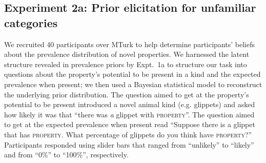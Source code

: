 \documentclass{pnastwo}
\begin{document}
\begin{article}
\begin{materials}
\subsection{Experiment 2a: Prior elicitation for unfamiliar categories}
We recruited 40 participants over MTurk to help determine participants' beliefs about the prevalence distribution of novel properties.
We harnessed the latent structure revealed in prevalence priors by Expt.~1a to structure our task into questions about the property's potential to be present in a kind and the expected prevalence when present; we then used a Bayesian statistical model to reconstruct the underlying prior distribution. 
The question aimed to get at the property's potential to be present introduced a novel animal kind (e.g. glippets) and asked how likely it was that  ``there was \emph{a} glippet with \textsc{property}''.
The question aimed to get at the expected prevalence when present read ``Suppose there is a glippet that has \textsc{property}. What percentage of glippets do you think have \textsc{property}?'' 
Participants responded using slider bars that ranged from  ``unlikely'' to ``likely'' and from ``0\%'' to ``100\%'', respectively.

\end{materials}
\end{article}
\end{document}
